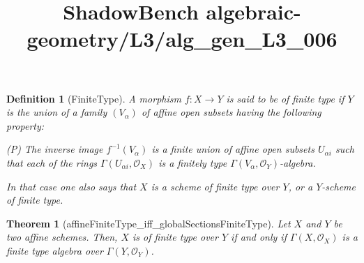 \documentclass{article}
\title{ShadowBench algebraic-geometry/L3/alg\_gen\_L3\_006}
\newtheorem{theorem}{Theorem}
\newtheorem{definition}{Definition}
\begin{document}
\maketitle

\begin{definition}[FiniteType]
A morphism \(f : X \to Y\) is said to be \emph{of finite type} if \(Y\) is the union of a family \((V_\alpha)\) of affine open subsets having the following property:

\medskip

\noindent
(P) The inverse image \(f^{-1}(V_\alpha)\) is a finite union of affine open subsets \(U_{\alpha i}\) such that each of the rings \(\Gamma(U_{\alpha i},\mathcal O_X)\) is a finitely type \(\Gamma(V_\alpha,\mathcal O_Y)\)-algebra.

\medskip

In that case one also says that \(X\) is a scheme of finite type over \(Y\), or a \(Y\)-scheme of finite type.
\end{definition}

\begin{theorem}[affineFiniteType_iff_globalSectionsFiniteType]
Let \(X\) and \(Y\) be two affine schemes. Then, \(X\) is of finite type over \(Y\) if and only if \(\Gamma(X,\mathcal O_X)\) is a finite type algebra over \(\Gamma(Y,\mathcal O_Y)\).
\end{theorem}
\end{document}
